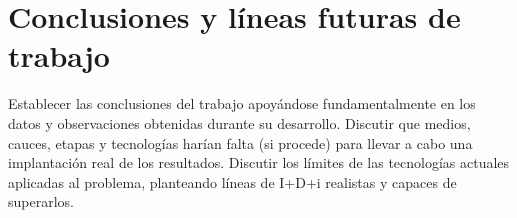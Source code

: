 \chapter{Conclusiones y líneas futuras de trabajo}

Establecer las conclusiones del trabajo apoyándose fundamentalmente en los datos y observaciones obtenidas durante su desarrollo. Discutir que medios, cauces, etapas y tecnologías harían falta (si procede) para llevar a cabo una implantación real de los resultados.
Discutir los límites de las tecnologías actuales aplicadas al problema, planteando líneas de I+D+i realistas y capaces de superarlos.
